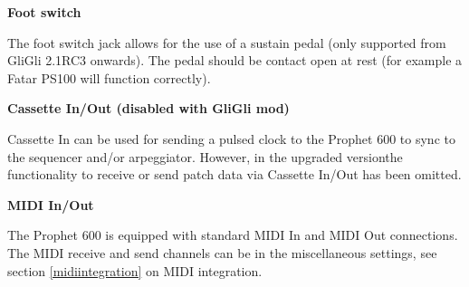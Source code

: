 \textbf{Foot switch}

The foot switch jack allows for the use of a sustain pedal (only supported from GliGli 2.1RC3 onwards). The pedal should be contact open at rest (for example a Fatar PS100 will function correctly).

\textbf{Cassette In/Out (disabled with GliGli mod)}

Cassette In can be used for sending a pulsed clock to the Prophet 600 to sync to the sequencer and/or arpeggiator. However, in the upgraded versionthe functionality to receive or send patch data via Cassette In/Out has been omitted. 

\textbf{MIDI In/Out}

The Prophet 600 is equipped with standard MIDI In and MIDI Out connections. The MIDI receive and send channels can be in the miscellaneous settings, see section \ref{midiintegration} on MIDI integration.  
